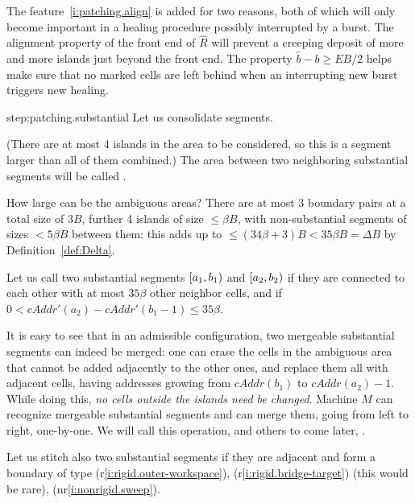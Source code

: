 \documentclass[12pt]{memoir}
\newcommand{\fld}[1]{\ensuremath{\textit{#1}}}
\def\B{B}
\newcommand{\E}{E}
\newcommand{\cAddr}{\fld{cAddr}}
\begin{document}
The feature~\eqref{i:patching.align} is added for two reasons, both of which 
will only become important in a healing procedure possibly interrupted by
a burst.
The alignment property of the front end of \( \hat R \) will prevent 
a creeping deposit of more and more islands just beyond the front end.
The property \( \hat b-b\ge \E\B/2 \) helps make sure that no marked cells are left
behind when an interrupting new burst triggers new healing.

\begin{Proof}
\begin{step+}{step:patching.substantial}
Let us consolidate segments.
\end{step+}
\begin{prooofi}
(There are at most 4 islands in the area to be considered, so this is a segment 
larger than all of them combined.)
The area between two neighboring substantial segments will be called .

How large can be the ambiguous areas?
There are at most 3 boundary pairs at a total size of \( 3\B \), 
further 4 islands of size \( \le\beta\B \), with non-substantial segments of sizes \( < 5\beta\B \)
between them: this adds up to \( \le (34\beta+3)\B<35\beta\B=\Delta\B \) 
by Definition~\ref{def:Delta}.

Let us call two substantial  segments \( [a_{1},b_{1}) \) and \( [a_{2},b_{2}) \)
 if they are connected to each other with at most
\( 35\beta \) other neighbor cells, and if \( 0<\cAddr'(a_{2})-\cAddr'(b_{1}-1)\le 35\beta \).

It is easy to see that in an admissible configuration, two mergeable substantial segments can indeed
be merged: one can erase the cells in the ambiguous area
that cannot be added adjacently to the other ones, and replace them all with adjacent cells,
having addresses growing from \( \cAddr(b_{1}) \) to \( \cAddr(a_{2})-1 \).
While doing this, \emph{no cells outside the islands need be changed}.
Machine \( M \) can recognize mergeable substantial segments and can merge them, going from left to 
right, one-by-one.
We will call this operation, and others to come later, .

Let us stitch also two substantial segments if they are adjacent and form a boundary of type
(r\ref{i:rigid.outer-workspace}), (r\ref{i:rigid.bridge-target}) (this would be rare),
(nr\ref{i:nonrigid.sweep}).
\end{prooofi} %


\end{Proof}
\end{document}
